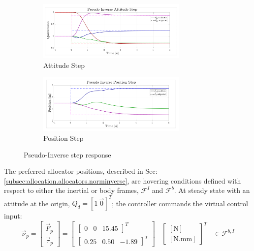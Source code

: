 \begin{figure}[hbtp]
\vspace{-12pt}
\centering
\begin{subfigure}{\textwidth}
\centering
\includegraphics[width=0.8\textwidth]{graphs/pseudo_inverse_attitude}
\vspace{-12pt}
\caption{Attitude Step}
\label{fig:pseudo_inverse_attitude}
\end{subfigure}
\begin{subfigure}{\textwidth}
\vspace{-3pt}
\centering
\includegraphics[width=0.8\textwidth]{graphs/pseudo_inverse_position}
\vspace{-12pt}
\caption{Position Step}
\label{fig:pseudo_inverse_position}
\end{subfigure}
\vspace{-8pt}
\caption{Pseudo-Inverse step response}
\label{fig:pseudo-inverse-step}
\vspace{-24pt}
\end{figure}
\par
The preferred allocator positions, described in Sec:\ref{subsec:allocation.allocators.norminverse}, are hovering conditions defined with respect to either the inertial or body frames, $\mathcal{F}^{I}$ and $\mathcal{F}^{b}$. At steady state with an attitude at the origin, $Q_d=[1~\vec{0}]^T$; the controller commands the virtual control input:
\begin{equation}\label{eq:hover-actuator}
\vec{\nu}_p=\begin{bmatrix}
\vec{F}_p\\
\vec{\tau}_p
\end{bmatrix}
=
\begin{bmatrix}
\begin{bmatrix}
0&0&15.45
\end{bmatrix}^T
\\
\begin{bmatrix}
0.25&
0.50&
-1.89
\end{bmatrix}^T
\end{bmatrix}~~~~\begin{bmatrix}
[\text{N}]\\
[\text{N.mm}]
\end{bmatrix}^T~~~~\in\mathcal{F}^{b,I}
\end{equation}
